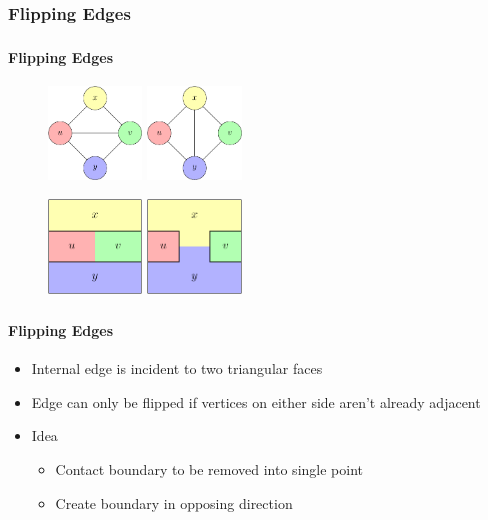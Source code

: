 \documentclass[t,18pt]{beamer}
\begin{document}
\subsubsection{Flipping Edges}
\label{subsubsect:flipping-edges}

\begin{frame}[c]
  \frametitle{}
  \framesubtitle{Flipping Edges}
  \begin{figure}
    \includegraphics[height=2.5cm]{../Thesis/Resources/FlipEdge-Example-Internal-1.pdf}
    \quad
    \includegraphics[height=2.5cm]{../Thesis/Resources/FlipEdge-Example-Internal-2.pdf}
  \end{figure}
  \begin{figure}
    \includegraphics[height=2.5cm]{../Thesis/Resources/FlipEdge-Example-Internal-3.pdf}
    \qquad
    \includegraphics[height=2.5cm]{../Thesis/Resources/FlipEdge-Example-Internal-4.pdf}
  \end{figure}
\end{frame}

\begin{frame}
  \frametitle{}
  \framesubtitle{Flipping Edges}
  \begin{itemize}
    \item Internal edge is incident to two triangular faces
    \item Edge can only be flipped if vertices on either side aren’t already adjacent
    \vspace{1cm}
    \item<2-> Idea \begin{itemize}
      \item<2-> Contact boundary to be removed into single point
      \item<2-> Create boundary in opposing direction
    \end{itemize}
  \end{itemize}
\end{frame}
\end{document}
